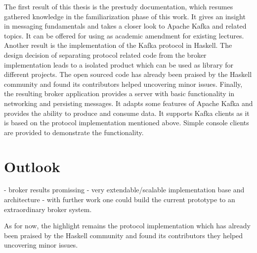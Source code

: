 The first result of this thesis is the prestudy documentation, which
resumes gathered knowledge in the familiarization phase of this work.
It gives an insight in messaging fundamentals and  takes a closer look to Apache
Kafka and related topics. It can be offered for using as academic amendment for
existing lectures. Another result is the implementation of the Kafka protocol in
Haskell. The design decision of separating protocol related code from the broker
implementation leads to a isolated product which can be used as library for
different projects. The open sourced code has already been praised by the
Haskell community and found its contributors helped uncovering minor
issues. Finally, the resulting broker application provides a server
with basic functionality in networking and persisting messages. It adapts
some features of Apache Kafka and provides the ability to produce and consume
data. It supports Kafka clients as it is based on the protocol implementation
mentioned above. Simple console clients are provided to demonstrate the
functionality.

\section{Outlook}

- broker results promissing
- very extendable/scalable implementation base and architecture
- with further work one could build the current prototype to an extraordinary
broker system.

As for now, the highlight remains the protocol implementation which has already
been praised by the Haskell community and found its contributors they helped
uncovering minor issues.
